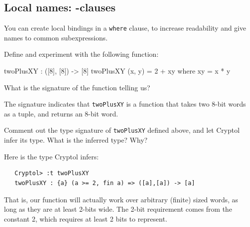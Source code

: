\subsection{Local names: {}-clauses}
\label{sec:local-names:-ttfam}

You can create local bindings in a {\tt where} clause\indWhere, to
increase readability and give names to common subexpressions.

\begin{Exercise}\label{ex:fn:1}
Define and experiment with the following function:
\begin{code}
  twoPlusXY : ([8], [8]) -> [8]
  twoPlusXY (x, y) = 2 + xy
     where xy = x * y
\end{code}
What is the signature of the function telling us?
\end{Exercise}
\begin{Answer}
  The signature indicates that {\tt twoPlusXY} is a function that
  takes two 8-bit words as a tuple, and returns an 8-bit word.
\end{Answer}

\begin{Exercise}\label{ex:fn:1.1}
  Comment out the type signature of {\tt twoPlusXY} defined above, and
  let Cryptol infer its type. What is the inferred type? Why?
\end{Exercise}
\begin{Answer}
Here is the type Cryptol infers:
\begin{verbatim}
   Cryptol> :t twoPlusXY    
   twoPlusXY : {a} (a >= 2, fin a) => ([a],[a]) -> [a]
\end{verbatim}
That is, our function will actually work over arbitrary (finite) sized
words, as long as they are at least 2-bits wide. The 2-bit requirement
comes from the constant 2, which requires at least 2 bits to
represent.
\end{Answer}

